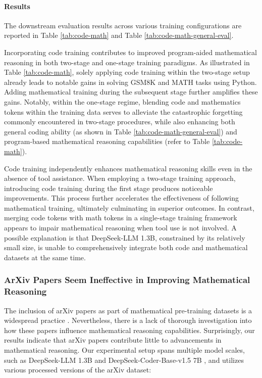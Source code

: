 \begin{itemize}[topsep=0pt]
\paragraph{Results}
The downstream evaluation results across various training configurations are reported in Table \ref{tab:code-math} and Table \ref{tab:code-math-general-eval}.

Incorporating code training contributes to improved program-aided mathematical reasoning in both two-stage and one-stage training paradigms. As illustrated in Table \ref{tab:code-math}, solely applying code training within the two-stage setup already leads to notable gains in solving GSM8K and MATH tasks using Python. Adding mathematical training during the subsequent stage further amplifies these gains. Notably, within the one-stage regime, blending code and mathematics tokens within the training data serves to alleviate the catastrophic forgetting commonly encountered in two-stage procedures, while also enhancing both general coding ability (as shown in Table \ref{tab:code-math-general-eval}) and program-based mathematical reasoning capabilities (refer to Table \ref{tab:code-math}).

Code training independently enhances mathematical reasoning skills even in the absence of tool assistance. When employing a two-stage training approach, introducing code training during the first stage produces noticeable improvements. This process further accelerates the effectiveness of following mathematical training, ultimately culminating in superior outcomes. In contrast, merging code tokens with math tokens in a single-stage training framework appears to impair mathematical reasoning when tool use is not involved. A possible explanation is that DeepSeek-LLM 1.3B, constrained by its relatively small size, is unable to comprehensively integrate both code and mathematical datasets at the same time.

\subsubsection{ArXiv Papers Seem Ineffective in Improving Mathematical Reasoning}

The inclusion of arXiv papers as part of mathematical pre-training datasets is a widespread practice \citep{minerva,gpt-f,llemma,mathpile}. Nevertheless, there is a lack of thorough investigation into how these papers influence mathematical reasoning capabilities. Surprisingly, our results indicate that arXiv papers contribute little to advancements in mathematical reasoning. Our experimental setup spans multiple model scales, such as DeepSeek-LLM 1.3B and DeepSeek-Coder-Base-v1.5 7B \citep{deepseek-coder}, and utilizes various processed versions of the arXiv dataset:


\end{itemize}
